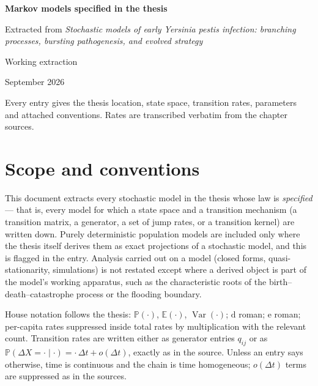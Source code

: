 \documentclass[11pt,a4paper]{report}
\newcommand{\pr}[1]{\mathbb{P}\!\left(#1\right)}
\newcommand{\ex}[1]{\mathbb{E}\!\left(#1\right)}
\newcommand{\var}[1]{\operatorname{Var}\!\left(#1\right)}
\newcommand{\dd}{\mathrm{d}}
\newcommand{\ee}{\mathrm{e}}
\theoremstyle{definition}
\begin{document}
\begin{titlepage}
\centering
\vspace*{3.2cm}
{\LARGE\bfseries Markov models specified in the thesis\par}
\vspace{10pt}
{\large Extracted from \textit{Stochastic models of early \textit{Yersinia pestis}
infection: branching processes, bursting pathogenesis, and evolved strategy}\par}
\vspace{2.4cm}
{\large Working extraction\par}
\vspace{6pt}
{September 2026\par}
\vfill
{\small Every entry gives the thesis location, state space, transition rates,
parameters and attached conventions. Rates are transcribed verbatim from the
chapter sources.\par}
\vspace*{1.2cm}
\end{titlepage}

\tableofcontents
\clearpage

\chapter*{Scope and conventions}

This document extracts every stochastic model in the thesis whose law is
\emph{specified} --- that is, every model for which a state space and a
transition mechanism (a transition matrix, a generator, a set of jump rates,
or a transition kernel) are written down. Purely deterministic population
models are included only where the thesis itself derives them as exact
projections of a stochastic model, and this is flagged in the entry.
Analysis carried out on a model (closed forms, quasi-stationarity,
simulations) is not restated except where a derived object is part of the
model's working apparatus, such as the characteristic roots of the
birth--death--catastrophe process or the flooding boundary.

House notation follows the thesis: $\pr{\cdot}$, $\ex{\cdot}$,
$\var{\cdot}$; $\dd$ roman; $\ee$ roman; per-capita rates suppressed inside
total rates by multiplication with the relevant count. Transition rates are
written either as generator entries $q_{ij}$ or as
$\pr{\Delta X = \cdot \mid \cdot} = \cdot\,\Delta t + o(\Delta t)$, exactly
as in the source. Unless an entry says otherwise, time is continuous and the
chain is time homogeneous; $o(\Delta t)$ terms are suppressed as in the
sources.
\end{document}
